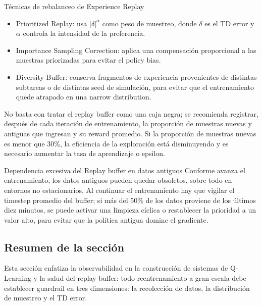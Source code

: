 \begin{knowledgebox}{Técnicas de rebalanceo de Experience Replay}
\begin{itemize}
    \item Prioritized Replay: usa $|\delta|^\alpha$ como peso de muestreo, donde $\delta$ es el TD error y $\alpha$ controla la intensidad de la preferencia.
    \item Importance Sampling Correction: aplica una compensación proporcional a las muestras priorizadas para evitar el policy bias.
    \item Diversity Buffer: conserva fragmentos de experiencia provenientes de distintas subtareas o de distintas seed de simulación, para evitar que el entrenamiento quede atrapado en una narrow distribution.
\end{itemize}
\end{knowledgebox}

No basta con tratar el replay buffer como una caja negra; se recomienda registrar, después de cada iteración de entrenamiento, la proporción de muestras nuevas y antiguas que ingresan y su reward promedio. Si la proporción de muestras nuevas es menor que 30\%, la eficiencia de la exploración está disminuyendo y es necesario aumentar la tasa de aprendizaje o epsilon.

\begin{warningbox}{Dependencia excesiva del Replay buffer en datos antiguos}
Conforme avanza el entrenamiento, los datos antiguos pueden quedar obsoletos, sobre todo en entornos no estacionarios. Al continuar el entrenamiento hay que vigilar el timestep promedio del buffer; si más del 50\% de los datos proviene de los últimos diez minutos, se puede activar una limpieza cíclica o restablecer la prioridad a un valor alto, para evitar que la política antigua domine el gradiente.
\end{warningbox}

\subsection{Resumen de la sección}

Esta sección enfatiza la observabilidad en la construcción de sistemas de Q-Learning y la salud del replay buffer: todo reentrenamiento a gran escala debe establecer guardrail en tres dimensiones: la recolección de datos, la distribución de muestreo y el TD error.
